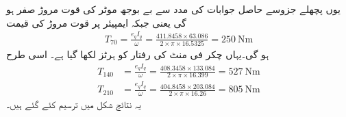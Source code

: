 \begin{itemize}
یوں پچھلے جزوسے حاصل جوابات کی مدد سے بے بوجھ موٹر کی قوت مروڑ  صفر ہو گی یعنی   جبکہ   ایمپیئر پر قوت مروڑ کی قیمت
\begin{align*}
T_{70}=\frac{e_q I_q}{\omega}=\frac{411.8458 \times 63.086}{2 \times \pi \times 16.5325}=\SI{250}{\newton \meter}
\end{align*}
ہو گی۔یہاں  چکر فی منٹ کی رفتار کو  ہرٹز لکھا گیا ہے۔ اسی طرح
\begin{align*}
T_{140}&=\frac{e_q I_q}{\omega}=\frac{408.3458 \times 133.084}{2 \times \pi \times 16.399}=\SI{527}{\newton \meter}\\
T_{210}&=\frac{e_q I_q}{\omega}=\frac{404.8458 \times  203.084}{2 \times \pi \times 16.26}=\SI{805}{\newton \meter}
\end{align*}
یہ نتائج شکل   میں ترسیم کئے گئے ہیں۔
\end{itemize}

